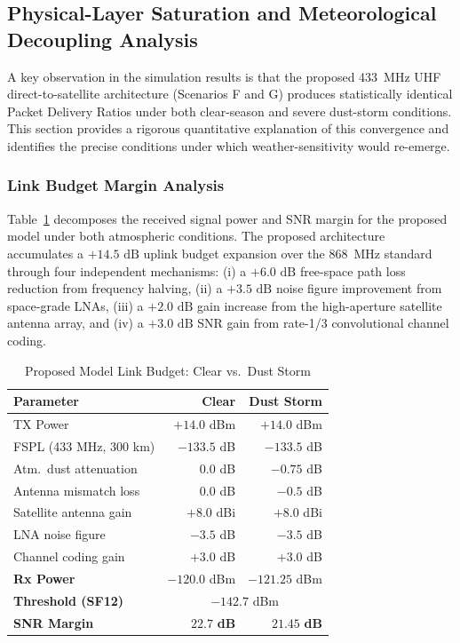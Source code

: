 \documentclass[journal,10pt,doublecolumn]{IEEEtran}
\begin{document}
\subsection{Physical-Layer Saturation and Meteorological Decoupling Analysis}
\label{subsec:decoupling_analysis}

A key observation in the simulation results is that the proposed 433~MHz UHF direct-to-satellite architecture (Scenarios F and G) produces statistically identical Packet Delivery Ratios under both clear-season and severe dust-storm conditions. This section provides a rigorous quantitative explanation of this convergence and identifies the precise conditions under which weather-sensitivity would re-emerge.

\subsubsection{Link Budget Margin Analysis}
Table~\ref{tab:link_margin} decomposes the received signal power and SNR margin for the proposed model under both atmospheric conditions. The proposed architecture accumulates a $+14.5\text{ dB}$ uplink budget expansion over the 868~MHz standard through four independent mechanisms: (i) a $+6.0\text{ dB}$ free-space path loss reduction from frequency halving, (ii) a $+3.5\text{ dB}$ noise figure improvement from space-grade LNAs, (iii) a $+2.0\text{ dB}$ gain increase from the high-aperture satellite antenna array, and (iv) a $+3.0\text{ dB}$ SNR gain from rate-1/3 convolutional channel coding.

\begin{table}[h]
\renewcommand{\arraystretch}{1.3}
\caption{Proposed Model Link Budget: Clear vs.\ Dust Storm}
\label{tab:link_margin}
\centering
\footnotesize
\begin{tabular}{p{3.2cm}|r|r}
\hline
\textbf{Parameter} & \textbf{Clear} & \textbf{Dust Storm} \\
\hline
TX Power                     & $+14.0$ dBm  & $+14.0$ dBm  \\
FSPL (433 MHz, 300 km)       & $-133.5$ dB  & $-133.5$ dB  \\
Atm.\ dust attenuation       & $0.0$ dB     & $-0.75$ dB   \\
Antenna mismatch loss        & $0.0$ dB     & $-0.5$ dB    \\
Satellite antenna gain       & $+8.0$ dBi   & $+8.0$ dBi   \\
LNA noise figure             & $-3.5$ dB    & $-3.5$ dB    \\
Channel coding gain          & $+3.0$ dB    & $+3.0$ dB    \\
\hline
\textbf{Rx Power}            & $-120.0$ dBm & $-121.25$ dBm \\
\textbf{Threshold (SF12)}    & \multicolumn{2}{c}{$-142.7$ dBm} \\
\textbf{SNR Margin}          & $\mathbf{22.7}$ \textbf{dB} & $\mathbf{21.45}$ \textbf{dB} \\
\hline
\end{tabular}
\end{table}
\end{document}
